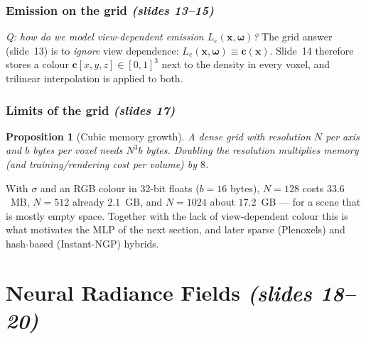 \documentclass[11pt,a4paper]{article}
\newcommand{\sref}[1]{\texorpdfstring{\emph{(slides #1)}}{(slides #1)}}
\newcommand{\om}{\boldsymbol{\omega}}
\newcommand{\cc}{\boldsymbol{c}}
\newcommand{\xx}{\boldsymbol{x}}
\newcommand{\Le}{L_e}
\theoremstyle{definition}
\theoremstyle{plain}
\newtheorem{proposition}[definition]{Proposition}
\theoremstyle{remark}
\begin{document}
\subsubsection*{Emission on the grid \sref{13--15}}

\emph{Q: how do we model view-dependent emission $\Le(\xx,\om)$?} The grid answer (slide~13) is to \emph{ignore} view dependence: $\Le(\xx,\om)\equiv\cc(\xx)$. Slide~14 therefore stores a colour $\cc[x,y,z]\in[0,1]^3$ next to the density in every voxel, and trilinear interpolation is applied to both.



\subsubsection*{Limits of the grid \sref{17}}


\begin{proposition}[Cubic memory growth]\label{prop:cubic}
A dense grid with resolution $N$ per axis and $b$ bytes per voxel needs $N^3b$ bytes. Doubling the resolution multiplies memory (and training/rendering cost per volume) by $8$.
\end{proposition}
\begin{intuition}
With $\sigma$ and an RGB colour in 32-bit floats ($b=16$ bytes), $N=128$ costs $33.6$~MB, $N=512$ already $2.1$~GB, and $N=1024$ about $17.2$~GB --- for a scene that is mostly empty space. Together with the lack of view-dependent colour this is what motivates the MLP of the next section, and later sparse (Plenoxels) and hash-based (Instant-NGP) hybrids.
\end{intuition}

\section{Neural Radiance Fields \sref{18--20}}
\end{document}
